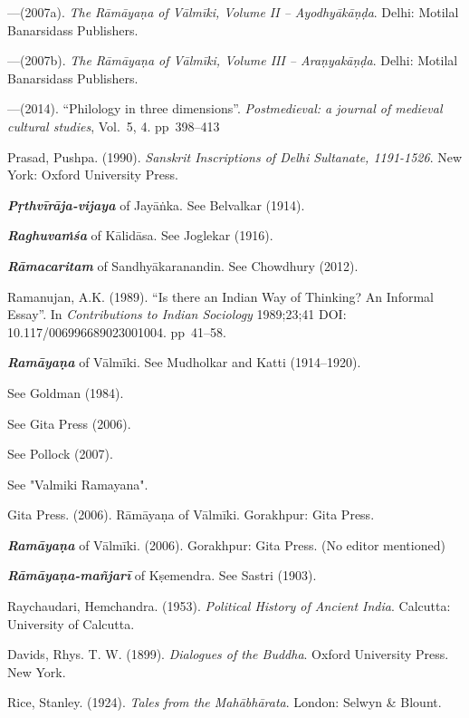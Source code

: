 \begin{thebibliography}{99}
---\kern3pt(2007a). {\sl The Rāmāyaṇa of Vālmīki, Volume II – Ayodhyākāṇḍa}. Delhi: Motilal Banarsidass Publishers. 

---\kern3pt(2007b). {\sl The Rāmāyaṇa of Vālmīki, Volume III – Araṇyakāṇḍa}. Delhi: Motilal Banarsidass Publishers. 

---\kern3pt(2014). “Philology in three dimensions”. {\sl Postmedieval: a journal of medieval cultural studies}, Vol.~5, 4. pp~398--413

Prasad, Pushpa. (1990). {\sl Sanskrit Inscriptions of Delhi Sultanate, 1191-1526}. New York: Oxford University Press. 

{\sl\bfseries Pṛthvīrāja-vijaya} of Jayāṅka. See Belvalkar (1914).

{\sl\bfseries Raghuvaṁśa} of Kālidāsa. See Joglekar (1916).

{\sl\bfseries Rāmacaritam} of Sandhyākaranandin. See Chowdhury (2012).

Ramanujan, A.K. (1989). “Is there an Indian Way of Thinking? An Informal Essay”. In {\sl Contributions to Indian Sociology} 1989;23;41 DOI: 10.117/006996689023001004. pp~41--58.

{\sl\bfseries Ramāyaṇa} of Vālmīki. See Mudholkar and Katti (1914--1920).

See Goldman (1984).

See Gita Press (2006).

See Pollock (2007).

See "Valmiki Ramayana".

Gita Press. (2006). Rāmāyaṇa of Vālmīki. Gorakhpur: Gita Press.

{\sl\bfseries Ramāyaṇa} of Vālmīki. (2006). Gorakhpur: Gita Press. (No editor mentioned)

{\sl\bfseries Rāmāyaṇa-mañjarī} of Kṣemendra. See Sastri (1903).

Raychaudari, Hemchandra. (1953). {\sl Political History of Ancient India}. Calcutta: University of Calcutta.

Davids, Rhys. T. W. (1899). {\sl Dialogues of the Buddha}. Oxford University Press. New York.

Rice, Stanley. (1924). {\sl Tales from the Mahābhārata}. London: Selwyn \& Blount. 


\end{thebibliography}
